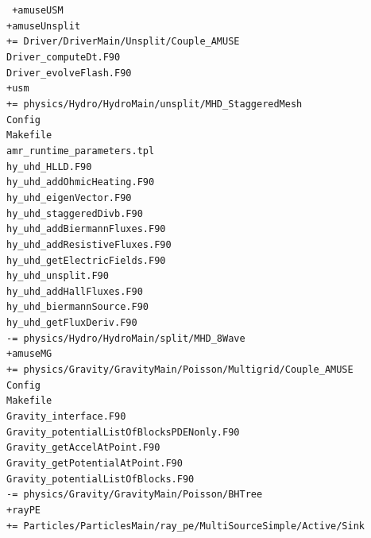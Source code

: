 \documentclass[10pt]{article}
\newcommand*{\tab}{\hspace*{10mm}}
\begin{document}
\texttt{
+amuseUSM\\
\tab+amuseUnsplit\\
\tab\tab += Driver/DriverMain/Unsplit/Couple\_AMUSE\\
\tab\tab\tab Driver\_computeDt.F90\\  
\tab\tab\tab Driver\_evolveFlash.F90\\
\tab +usm\\
\tab\tab += physics/Hydro/HydroMain/unsplit/MHD\_StaggeredMesh\\
\tab\tab\tab Config\\
\tab\tab\tab Makefile\\
\tab\tab\tab amr\_runtime\_parameters.tpl\\
\tab\tab\tab hy\_uhd\_HLLD.F90\\
\tab\tab\tab hy\_uhd\_addOhmicHeating.F90\\
\tab\tab\tab hy\_uhd\_eigenVector.F90\\
\tab\tab\tab hy\_uhd\_staggeredDivb.F90\\
\tab\tab\tab hy\_uhd\_addBiermannFluxes.F90\\ 
\tab\tab\tab hy\_uhd\_addResistiveFluxes.F90\\
\tab\tab\tab hy\_uhd\_getElectricFields.F90\\
\tab\tab\tab hy\_uhd\_unsplit.F90\\
\tab\tab\tab hy\_uhd\_addHallFluxes.F90\\
\tab\tab\tab hy\_uhd\_biermannSource.F90\\
\tab\tab\tab hy\_uhd\_getFluxDeriv.F90\\
\tab\tab -= physics/Hydro/HydroMain/split/MHD\_8Wave\\
+amuseMG\\
\tab += physics/Gravity/GravityMain/Poisson/Multigrid/Couple\_AMUSE\\
\tab\tab Config\\
\tab\tab Makefile\\
\tab\tab Gravity\_interface.F90\\
\tab\tab Gravity\_potentialListOfBlocksPDENonly.F90\\
\tab\tab Gravity\_getAccelAtPoint.F90\\
\tab\tab Gravity\_getPotentialAtPoint.F90\\ 
\tab\tab Gravity\_potentialListOfBlocks.F90\\ 
\tab -= physics/Gravity/GravityMain/Poisson/BHTree\\
+rayPE\\
\tab += Particles/ParticlesMain/ray\_pe/MultiSourceSimple/Active/Sink\\
}
\end{document}
